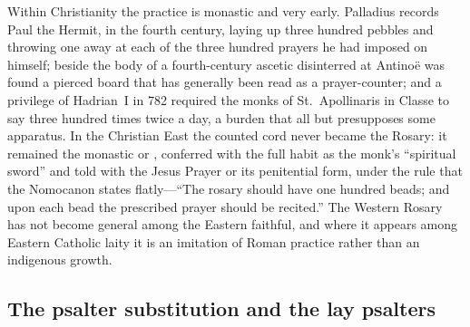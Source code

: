 Within Christianity the practice is monastic and very early. Palladius
records Paul the Hermit, in the fourth century, laying up three hundred
pebbles and throwing one away at each of the three hundred prayers he
had imposed on himself; beside the body of a fourth-century ascetic
disinterred at Antino\"e was found a pierced board that has generally
been read as a prayer-counter; and a privilege of Hadrian~I in 782
required the monks of St.~Apollinaris in Classe to say  three hundred times twice a day, a burden that all but
presupposes some apparatus. In the Christian East the counted cord never
became the Rosary: it remained the monastic  or
, conferred with the full habit as the monk's
``spiritual sword'' and told with the Jesus Prayer or its penitential
form, under the rule that the Nomocanon states flatly---``The rosary
should have one hundred beads; and upon each bead the prescribed prayer
should be recited.'' The Western Rosary has not become general among the
Eastern faithful, and where it appears among Eastern Catholic laity it
is an imitation of Roman practice rather than an indigenous
growth.

\subsection{The psalter substitution and the lay psalters}


